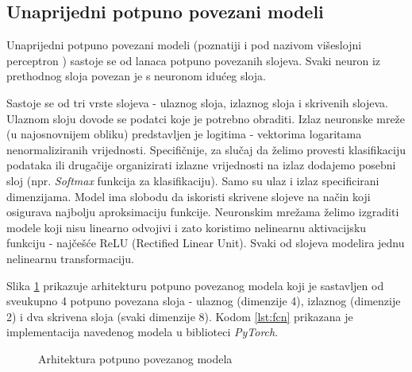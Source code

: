 \subsection{Unaprijedni potpuno povezani modeli}

Unaprijedni potpuno povezani modeli  (poznatiji i pod nazivom višeslojni perceptron ) sastoje se od lanaca potpuno povezanih slojeva. Svaki neuron iz prethodnog sloja povezan je s neuronom idućeg sloja. 

Sastoje se od tri vrste slojeva - ulaznog sloja, izlaznog sloja i skrivenih slojeva. Ulaznom sloju dovode se podatci koje je potrebno obraditi. Izlaz neuronske mreže (u najosnovnijem obliku) predstavljen je logitima  - vektorima logaritama nenormaliziranih vrijednosti. Specifičnije, za slučaj da želimo provesti klasifikaciju podataka ili drugačije organizirati izlazne vrijednosti na izlaz dodajemo posebni sloj (npr. \textit{Softmax} funkcija za klasifikaciju). Samo su ulaz i izlaz specificirani dimenzijama. Model ima slobodu da iskoristi skrivene slojeve na način koji osigurava najbolju aproksimaciju funkcije. Neuronskim mrežama želimo izgraditi modele koji nisu linearno odvojivi i zato koristimo nelinearnu aktivacijsku funkciju - najčešće ReLU (Rectified Linear Unit). Svaki od slojeva modelira jednu nelinearnu transformaciju.

Slika \ref{fig:nn} \cite{NNsvg} prikazuje arhitekturu potpuno povezanog modela koji je sastavljen od sveukupno 4 potpuno povezana sloja - ulaznog (dimenzije 4), izlaznog (dimenzije 2) i dva skrivena sloja (svaki dimenzije 8). Kodom \ref{lst:fcn} prikazana je implementacija navedenog modela u biblioteci \textit{PyTorch}.

\begin{figure}[H]
    \centering
    \caption{Arhitektura potpuno povezanog modela}
    \label{fig:nn}
\end{figure}


